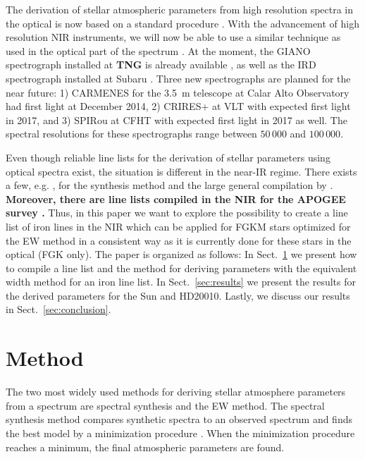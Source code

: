 \documentclass{aa}
\begin{document}
The derivation of stellar atmospheric parameters from high
resolution spectra in the optical is now based on a standard
procedure \citep[see e.g.][]{Valenti2005,Sousa2008a}. With the
advancement of high resolution NIR instruments, we will now be able to use a similar
technique as used in the optical part of the spectrum
\citep[see e.g.][]{Melendez1999,Sousa2008a,Tsantaki2013,Mucciarelli2013,Bensby2014}.
At the moment, the GIANO spectrograph installed at \textbf{TNG} is already
available \citep{GIANO}, as well as the IRD spectrograph installed
at Subaru \citep{IRD}. Three new spectrographs are planned for the
near future: 1) CARMENES for the \SI{3.5}{m} telescope at Calar Alto
Observatory \citep{CARMENES} had first light at December 2014,
2) CRIRES+ at VLT \citep{CRIRESp} with expected first light in 2017,
and 3) SPIRou at CFHT \citep{SPIROU1,SPIROU2} with expected first light
in 2017 as well. The spectral resolutions for these spectrographs range
between $50\,000$ and $100\,000$.

Even though reliable line lists for the derivation of stellar parameters
using optical spectra exist, the situation is different in the near-IR
regime. There exists a few, e.g. \citet{Onehag2012,Origlia2013,Rhodin2015},
for the synthesis method and the large general compilation by
\citet{Melendez1999}. \textbf{Moreover, there are line lists compiled
in the NIR for the APOGEE survey \citep[see e.g.][]{Smith2013,Shetrone2015}.}
Thus, in this paper we want to explore the
possibility to create a line list of iron lines in the NIR which can
be applied for FGKM stars optimized for the EW method in a consistent
way as it is currently done for these stars in the optical (FGK
only). The paper is organized as follows: In Sect.~\ref{sec:method}
we present how to compile a line list and the method for deriving
parameters with the equivalent width method for an iron line list.
In Sect.~\ref{sec:results} we present the results for the derived
parameters for the Sun and HD20010. Lastly, we discuss our results in
Sect.~\ref{sec:conclusion}.


\section{Method}
\label{sec:method}

The two most widely used methods for deriving stellar atmosphere
parameters from a spectrum are spectral synthesis and the EW method.
The spectral synthesis method compares synthetic spectra to an observed
spectrum and finds the best model by a minimization procedure
\citep[see e.g.][]{Valenti2005,Onehag2012,Blanco2014}. When the minimization
procedure reaches a minimum, the final atmospheric parameters are found.
\end{document}
